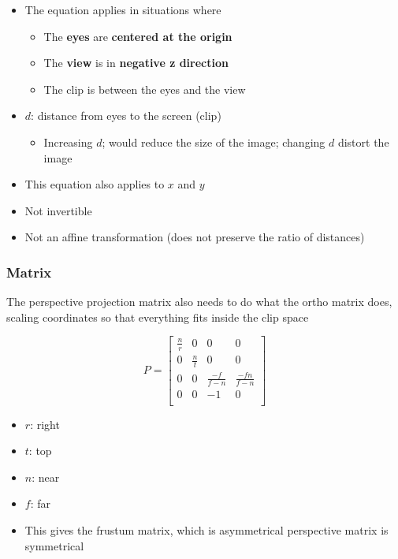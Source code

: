       \begin{itemize}
        \item The equation applies in situations where
        \begin{itemize}
          \item The \textbf{eyes} are \textbf{centered at the origin}
          \item The \textbf{view} is in \textbf{negative z direction}
          \item The clip is between the eyes and the view
        \end{itemize}

        \item $ d $: distance from eyes to the screen (clip)
        \begin{itemize}
          \item Increasing $ d $; would reduce the size of the image; changing
          $ d $ distort the image
        \end{itemize}
        \item This equation also applies to $ x $ and $ y $
        \item Not invertible
        \item Not an affine transformation (does not preserve the ratio of
        distances)
      \end{itemize}

    \subsubsection{Matrix}

      The perspective projection matrix also needs to do what the ortho matrix
      does, scaling coordinates so that everything fits inside the clip space

      \begin{equation}
        P =
        \begin{bmatrix}
          \frac{n}{r} & 0 & 0 & 0 \\
          0 & \frac{n}{t} & 0 & 0 \\
          0 & 0 & \frac{-f}{f - n} & \frac{-fn}{f - n} \\
          0 & 0 & -1 & 0 \\
        \end{bmatrix}
      \end{equation}

      \begin{itemize}
        \item $ r $: right
        \item $ t $: top
        \item $ n $: near
        \item $ f $: far
        \item This gives the frustum matrix, which is asymmetrical
        perspective matrix is symmetrical
      \end{itemize}


